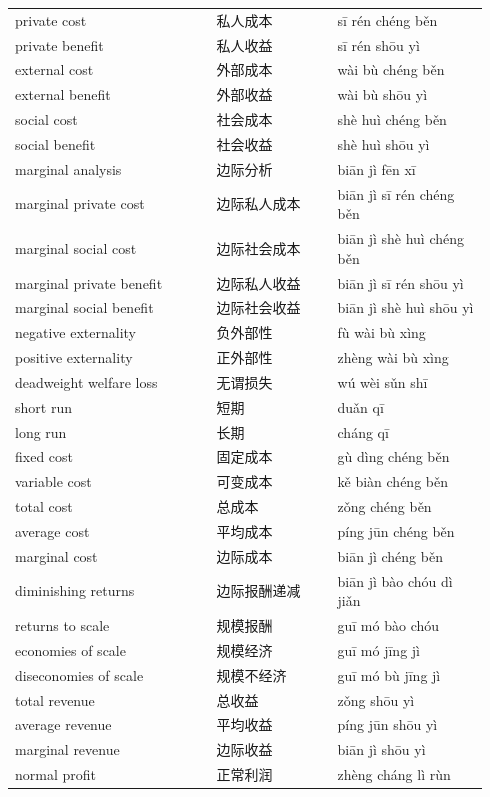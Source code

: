 \documentclass[11pt]{article}
\begin{document}
\begin{longtable}{@{}p{0.40\linewidth}p{0.24\linewidth}p{0.30\linewidth}@{}}
private cost & 私人成本 & sī rén chéng běn \\
private benefit & 私人收益 & sī rén shōu yì \\
external cost & 外部成本 & wài bù chéng běn \\
external benefit & 外部收益 & wài bù shōu yì \\
social cost & 社会成本 & shè huì chéng běn \\
social benefit & 社会收益 & shè huì shōu yì \\
marginal analysis & 边际分析 & biān jì fēn xī \\
marginal private cost & 边际私人成本 & biān jì sī rén chéng běn \\
marginal social cost & 边际社会成本 & biān jì shè huì chéng běn \\
marginal private benefit & 边际私人收益 & biān jì sī rén shōu yì \\
marginal social benefit & 边际社会收益 & biān jì shè huì shōu yì \\
negative externality & 负外部性 & fù wài bù xìng \\
positive externality & 正外部性 & zhèng wài bù xìng \\
deadweight welfare loss & 无谓损失 & wú wèi sǔn shī \\
short run & 短期 & duǎn qī \\
long run & 长期 & cháng qī \\
fixed cost & 固定成本 & gù dìng chéng běn \\
variable cost & 可变成本 & kě biàn chéng běn \\
total cost & 总成本 & zǒng chéng běn \\
average cost & 平均成本 & píng jūn chéng běn \\
marginal cost & 边际成本 & biān jì chéng běn \\
diminishing returns & 边际报酬递减 & biān jì bào chóu dì jiǎn \\
returns to scale & 规模报酬 & guī mó bào chóu \\
economies of scale & 规模经济 & guī mó jīng jì \\
diseconomies of scale & 规模不经济 & guī mó bù jīng jì \\
total revenue & 总收益 & zǒng shōu yì \\
average revenue & 平均收益 & píng jūn shōu yì \\
marginal revenue & 边际收益 & biān jì shōu yì \\
normal profit & 正常利润 & zhèng cháng lì rùn \\

\end{longtable}
\end{document}
